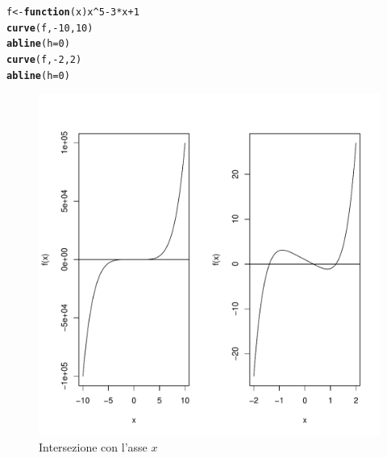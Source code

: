 \documentclass[onecolumn,11pt]{book}\usepackage[]{graphicx}\usepackage[]{color}
\makeatletter
\def\maxwidth{ %
  \ifdim\Gin@nat@width>\linewidth
    \linewidth
  \else
    \Gin@nat@width
  \fi
}
\newcommand{\hlnum}[1]{\textcolor[rgb]{0.686,0.059,0.569}{#1}}%
\newcommand{\hlopt}[1]{\textcolor[rgb]{0,0,0}{#1}}%
\newcommand{\hlstd}[1]{\textcolor[rgb]{0.345,0.345,0.345}{#1}}%
\newcommand{\hlkwa}[1]{\textcolor[rgb]{0.161,0.373,0.58}{\textbf{#1}}}%
\newcommand{\hlkwb}[1]{\textcolor[rgb]{0.69,0.353,0.396}{#1}}%
\newcommand{\hlkwc}[1]{\textcolor[rgb]{0.333,0.667,0.333}{#1}}%
\newcommand{\hlkwd}[1]{\textcolor[rgb]{0.737,0.353,0.396}{\textbf{#1}}}%
\newenvironment{kframe}{%
 \def\at@end@of@kframe{}%
 \ifinner\ifhmode%
  \def\at@end@of@kframe{\end{minipage}}%
  \begin{minipage}{\columnwidth}%
 \fi\fi%
 \def\FrameCommand##1{\hskip\@totalleftmargin \hskip-\fboxsep
 \colorbox{shadecolor}{##1}\hskip-\fboxsep
     \hskip-\linewidth \hskip-\@totalleftmargin \hskip\columnwidth}%
 \MakeFramed {\advance\hsize-\width
   \@totalleftmargin\z@ \linewidth\hsize
   \@setminipage}}%
 {\par\unskip\endMakeFramed%
 \at@end@of@kframe}
\newenvironment{knitrout}{}{} %
\makeatother
\begin{document}
\begin{knitrout}
\color{fgcolor}\begin{kframe}
\begin{alltt}
\hlstd{f}\hlkwb{<-}\hlkwa{function}\hlstd{(}\hlkwc{x}\hlstd{) x}\hlopt{^}\hlnum{5}\hlopt{-}\hlnum{3}\hlopt{*}\hlstd{x}\hlopt{+}\hlnum{1}
\hlkwd{curve}\hlstd{(f,}\hlopt{-}\hlnum{10}\hlstd{,}\hlnum{10}\hlstd{)}
\hlkwd{abline}\hlstd{(}\hlkwc{h}\hlstd{=}\hlnum{0}\hlstd{)}
\hlkwd{curve}\hlstd{(f,}\hlopt{-}\hlnum{2}\hlstd{,}\hlnum{2}\hlstd{)}
\hlkwd{abline}\hlstd{(}\hlkwc{h}\hlstd{=}\hlnum{0}\hlstd{)}
\end{alltt}
\end{kframe}
\end{knitrout}

\begin{figure}[htbp]
\begin{center}
\begin{knitrout}
\color{fgcolor}
\includegraphics[width=\maxwidth]{figure/unnamed-chunk-134-1} 

\end{knitrout}
\caption{Intersezione con l'asse $x$ }
\label{fig:tnewton}
\end{center}
\end{figure}
\end{document}
